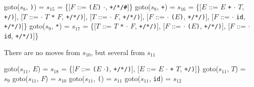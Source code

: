 \documentclass[8pt,a4paper,compress,handout]{beamer}
\newcommand{\mm}[1]{$#1$}
\newcommand{\subs}[2]{${#1}_{#2}$}
\newenvironment{spaced}
{
\smallskip
\hspace{.5cm}
\begin{minipage}[c]{\textwidth}
}
{
\end{minipage}
\smallskip
}
\begin{document}
\begin{frame}[fragile]
\pause

\text{ }
\begin{spaced}
\begin{production}
goto(\subs{s}{8}, \lstinline{)}) = \subs{s}{15}
               = \{[\mm{F}  ::= \lstinline{(}\mm{E}\lstinline{)} \mm{\cdot},  \lstinline{+/*/#}]\}
goto(\subs{s}{8}, \lstinline{+}) = \subs{s}{16}
               = \{[\mm{E}  ::= \mm{E} \lstinline{+} \mm{\cdot} \mm{T}, \lstinline{+/)}],
                    [\mm{T}  ::= \mm{\cdot} \mm{T} \lstinline{*} \mm{F}, \lstinline{+/*/)}],
                    [\mm{T}  ::= \mm{\cdot} \mm{F}, \lstinline{+/*/)}],
                    [\mm{F}  ::= \mm{\cdot} \lstinline{(}\mm{E}\lstinline{)}, \lstinline{+/*/)}],
                    [\mm{F}  ::= \mm{\cdot} \lstinline{id}, \lstinline{+/*/)}]\}
goto(\subs{s}{9}, \lstinline{*}) = \subs{s}{17}
               = \{[\mm{T}  ::= \mm{T} \lstinline{*} \mm{\cdot} \mm{F}, \lstinline{+/*/)}],
                    [\mm{F}  ::= \mm{\cdot} \lstinline{(}\mm{E}\lstinline{)}, \lstinline{+/*/)}],
                    [\mm{F}  ::= \mm{\cdot} \lstinline{id}, \lstinline{+/*/)}]\}
\end{production}
\end{spaced}

\pause

There are no moves from $s_{10}$, but several from $s_{11}$

\text{ }
\begin{spaced}
\begin{production}
goto(\subs{s}{11}, \mm{E}) = \subs{s}{18}
                 = \{[\mm{F}  ::= \lstinline{(}\mm{E} \mm{\cdot}\lstinline{)}, \lstinline{+/*/)}],
                     [\mm{E}  ::= \mm{E} \mm{\cdot} \lstinline{+} \mm{T}, \lstinline{+/)}]\}
goto(\subs{s}{11}, \mm{T}) = \subs{s}{9}
goto(\subs{s}{11}, \mm{F}) = \subs{s}{10}
goto(\subs{s}{11}, \lstinline{(}) = \subs{s}{11}
goto(\subs{s}{11}, \lstinline{id}) = \subs{s}{12}
\end{production}
\end{spaced}
\end{frame}
\end{document}
